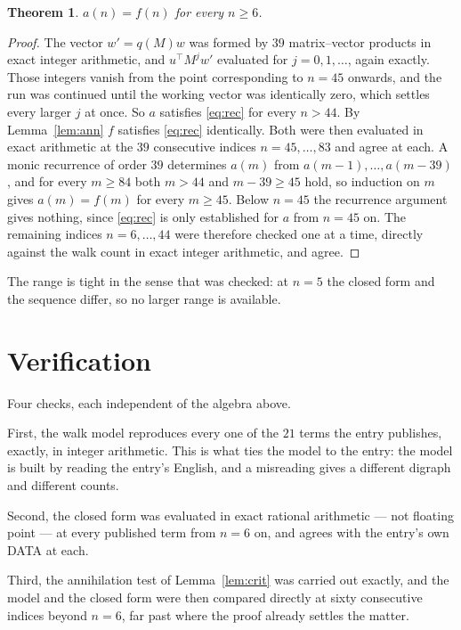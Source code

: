 \documentclass[11pt,a4paper]{article}
\theoremstyle{plain}
\newtheorem{theorem}{Theorem}
\theoremstyle{definition}
\begin{document}
\begin{theorem}
$a(n)=f(n)$ for every $n\ge6$.
\end{theorem}

\begin{proof}
The vector $w'=q(M)w$ was formed by $39$ matrix--vector products in exact integer
arithmetic, and $u^{\!\top}M^{j}w'$ evaluated for $j=0,1,\dots$, again exactly. Those integers
vanish from the point corresponding to $n=45$ onwards, and the run was continued until the
working vector was identically zero, which settles every larger $j$ at once. So $a$ satisfies
\eqref{eq:rec} for every $n>44$. By Lemma~\ref{lem:ann} $f$ satisfies \eqref{eq:rec}
identically. Both were then evaluated in exact arithmetic at the $39$ consecutive indices
$n=45,\dots,83$ and agree at each. A monic recurrence of order $39$
determines $a(m)$ from $a(m-1),\dots,a(m-39)$, and for every $m\ge84$ both
$m>44$ and $m-39\ge45$ hold, so induction on $m$ gives $a(m)=f(m)$ for every
$m\ge45$.
Below $n=45$ the recurrence argument gives nothing, since \eqref{eq:rec} is only
established for $a$ from $n=45$ on. The remaining indices $n=6,\dots,44$ were
therefore checked one at a time, directly against the walk count in exact integer arithmetic,
and agree.
\end{proof}

The range is tight in the sense that was checked: at $n=5$ the closed form and the sequence differ, so no larger range is available.

\section{Verification}

Four checks, each independent of the algebra above.

First, the walk model reproduces every one of the $21$ terms the entry publishes,
exactly, in integer arithmetic. This is what ties the model to the entry: the model is built
by reading the entry's English, and a misreading gives a different digraph and different
counts.

Second, the closed form was evaluated in exact rational arithmetic --- not floating point ---
at every published term from $n=6$ on, and agrees with the entry's own DATA at each.

Third, the annihilation test of Lemma~\ref{lem:crit} was carried out exactly, and the model
and the closed form were then compared directly at sixty consecutive indices beyond
$n=6$, far past where the proof already settles the matter.
\end{document}
